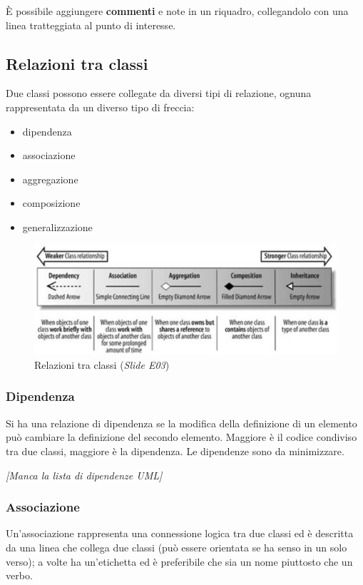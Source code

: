 \`E possibile aggiungere \textbf{commenti} e note in un riquadro, collegandolo con una linea tratteggiata al punto di interesse.

\subsection{Relazioni tra classi}

Due classi possono essere collegate da diversi tipi di relazione, ognuna rappresentata da un diverso tipo di freccia:
\begin{itemize}
\item dipendenza
\item associazione
\item aggregazione
\item composizione
\item generalizzazione
\end{itemize}

\begin{figure}[H]
    \includegraphics[width=1\textwidth]{res/img/relazioniClassi}
    \caption{Relazioni tra classi (\textit{Slide E03})}
\end{figure}

\subsubsection{Dipendenza}
Si ha una relazione di dipendenza se la modifica della definizione di un elemento può cambiare la definizione del secondo elemento. 
Maggiore è il codice condiviso tra due classi, maggiore è la dipendenza. Le dipendenze sono da minimizzare.

\textit{[Manca la lista di dipendenze UML]}

\subsubsection{Associazione}
Un'associazione rappresenta una connessione logica tra due classi ed è descritta da una linea che collega due classi 
(può essere orientata se ha senso in un solo verso); a volte ha un'etichetta ed è preferibile che sia un nome piuttosto che un verbo.


